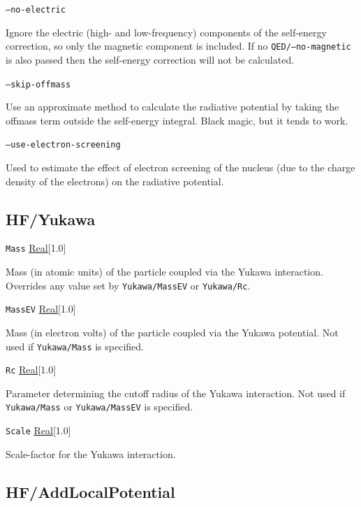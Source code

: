\documentclass{report}
\begin{document}
\texttt{--no-electric}
\begin{adjustwidth}{1cm}{}
Ignore the electric (high- and low-frequency) components of the self-energy correction, so only the
magnetic component is included. If no \texttt{QED/--no-magnetic} is also passed then the self-energy
correction will not be calculated.
\end{adjustwidth}

\texttt{--skip-offmass}
\begin{adjustwidth}{1cm}{}
Use an approximate method to calculate the radiative potential by taking the offmass term outside the self-energy integral.
Black magic, but it tends to work.
\end{adjustwidth}

\texttt{--use-electron-screening}
\begin{adjustwidth}{1cm}{}
Used to estimate the effect of electron screening of the nucleus (due to the charge density of the electrons)
on the radiative potential.
\end{adjustwidth}

\subsection{HF/Yukawa}
\texttt{Mass} \uline{Real}[1.0]
\begin{adjustwidth}{1cm}{}
Mass (in atomic units) of the particle coupled via the Yukawa interaction. Overrides any value set by
\texttt{Yukawa/MassEV} or \texttt{Yukawa/Rc}.
\end{adjustwidth}

\texttt{MassEV} \uline{Real}[1.0]
\begin{adjustwidth}{1cm}{}
Mass (in electron volts) of the particle coupled via the Yukawa potential. Not used if
\texttt{Yukawa/Mass} is specified.
\end{adjustwidth}

\texttt{Rc} \uline{Real}[1.0]
\begin{adjustwidth}{1cm}{}
Parameter determining the cutoff radius of the Yukawa interaction. Not used if \texttt{Yukawa/Mass}
or \texttt{Yukawa/MassEV} is specified.
\end{adjustwidth}

\texttt{Scale} \uline{Real}[1.0]
\begin{adjustwidth}{1cm}{}
Scale-factor for the Yukawa interaction.
\end{adjustwidth}

\subsection{HF/AddLocalPotential}
\end{document}
